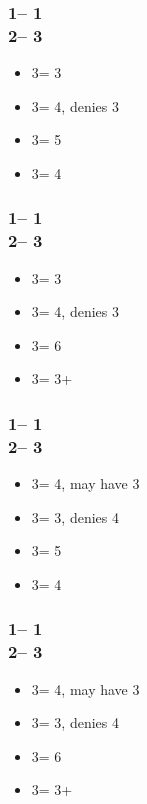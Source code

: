 \documentclass[12pt, a4paper]{report}
\begin{document}
{{        \subsubsection*{1\clubs -- 1\hearts \\ 2\nt -- 3\clubs}
        \begin{itemize}
            \item 3\diams = 3\hearts
            \item 3\hearts = 4\spades, denies 3\hearts
            \item 3\spades = 5\clubs
            \item 3\nt = 4\diams
        \end{itemize}

        \subsubsection*{1\diams -- 1\hearts \\ 2\nt -- 3\clubs}
        \begin{itemize}
            \item 3\diams = 3\hearts
            \item 3\hearts = 4\spades, denies 3\hearts
            \item 3\spades = 6\diams
            \item 3\nt = 3+\clubs
        \end{itemize}

        \subsubsection*{1\clubs -- 1\spades \\ 2\nt -- 3\clubs}
        \begin{itemize}
            \item 3\diams = 4\hearts, may have 3\spades
            \item 3\hearts = 3\spades, denies 4\hearts
            \item 3\spades = 5\clubs
            \item 3\nt = 4\diams
        \end{itemize}

        \subsubsection*{1\diams -- 1\spades \\ 2\nt -- 3\clubs}
        \begin{itemize}
            \item 3\diams = 4\hearts, may have 3\spades
            \item 3\hearts = 3\spades, denies 4\hearts
            \item 3\spades = 6\diams
            \item 3\nt = 3+\clubs
        \end{itemize}
    }

}
\end{document}
